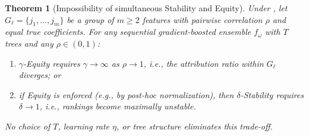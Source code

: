 \documentclass[11pt]{article}
\newtheorem{theorem}{Theorem}
\theoremstyle{remark}
\newcommand{\Gl}{G_\ell}                    %
\newcommand{\totalT}{T}                     %
\newcommand{\rhovar}{\rho}                  %
\begin{document}
\begin{theorem}[Impossibility of simultaneous Stability and Equity]
\label{thm:impossibility}
Under , let $\Gl = \{j_1, \dots, j_m\}$ be a group of
$m \geq 2$ features with pairwise correlation $\rhovar$ and equal true
coefficients.  For any sequential gradient-boosted ensemble $f_\omega$ with
$\totalT$ trees and any $\rhovar \in (0,1)$:
\begin{enumerate}
  \item[(i)] $\gamma$-Equity requires $\gamma \to \infty$ as
    $\rhovar \to 1$, i.e., the attribution ratio within $\Gl$ diverges; or
  \item[(ii)] if Equity is enforced (e.g., by post-hoc normalization), then
    $\delta$-Stability requires $\delta \to 1$, i.e., rankings become
    maximally unstable.
\end{enumerate}
No choice of $\totalT$, learning rate $\eta$, or tree structure
eliminates this trade-off.
\end{theorem}
\end{document}
